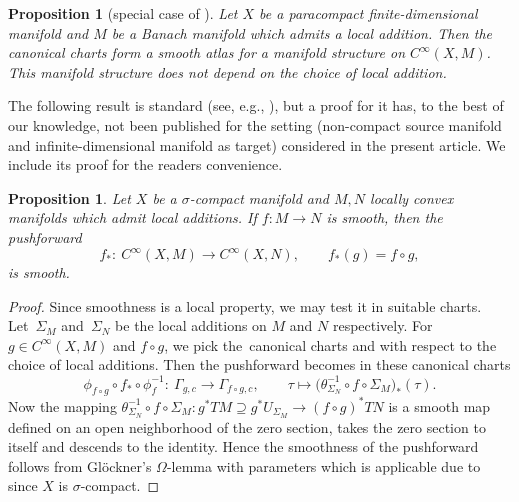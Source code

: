 \documentclass[pdftex]{sigma}
\numberwithin{equation}{section}
\newtheorem{Proposition}[Theorem]{Proposition}
\begin{document}
\begin{Proposition}[{special case of \cite[Theorem~1.4]{GaS22}}]
 Let $X$ be a paracompact finite-dimensional manifold and $M$ be a Banach manifold which admits a local addition.
 Then the canonical charts %
 form a smooth atlas for a manifold structure on $C^\infty (X,M)$. This manifold structure does not depend on the choice of local addition.
\end{Proposition}

The following result is standard (see, e.g., \cite[Section 2]{Sch23}), but a proof for it has, to the best of our knowledge, not been published for the setting (non-compact source manifold and infinite-dimensional manifold as target) considered in the present article. We include its proof for the readers convenience.

\begin{Proposition}\label{prop:smooth_pf}
Let $X$ be a $\sigma$-compact manifold and $M,N$ locally convex manifolds which admit local additions. If $f \colon M \rightarrow N$ is smooth, then the pushforward
\begin{displaymath}f_\ast \colon \ C^\infty (X,M) \rightarrow C^\infty (X,N),\qquad f_\ast (g) =f \circ g,
\end{displaymath}
is smooth.
\end{Proposition}

\begin{proof}
Since smoothness is a local property, we may test it in suitable charts. Let~$\Sigma_M$ and~$\Sigma_N$ be the local additions on $M$ and $N$ respectively. For $g \in C^\infty (X,M)$ and $f \circ g$, we pick the~canonical charts  and  with respect to the choice of local additions. Then the pushforward becomes in these canonical charts
\begin{displaymath}\phi_{f\circ g} \circ f_* \circ \phi^{-1}_f \colon\ \Gamma_{g,c} \rightarrow \Gamma_{f\circ g, c},\qquad \tau \mapsto \bigl(\theta_{\Sigma_N}^{-1} \circ f \circ \Sigma_M\bigr)_*(\tau).\end{displaymath}
Now the mapping $\theta_{\Sigma_N}^{-1} \circ f \circ \Sigma_M \colon g^{\ast}TM \supseteq g^\ast U_{\Sigma_M} \rightarrow (f\circ g)^\ast TN$ is a smooth map defined on an open neighborhood of the zero section, takes the zero section to itself and descends to the identity. Hence the smoothness of the pushforward follows from Gl\"ockner's $\Omega$-lemma with parameters \cite[Theorem~F.23]{glo04} which is applicable due to \cite[Lemma F.19\,(c)]{glo04} since $X$ is $\sigma$-compact.
\end{proof}
\end{document}
